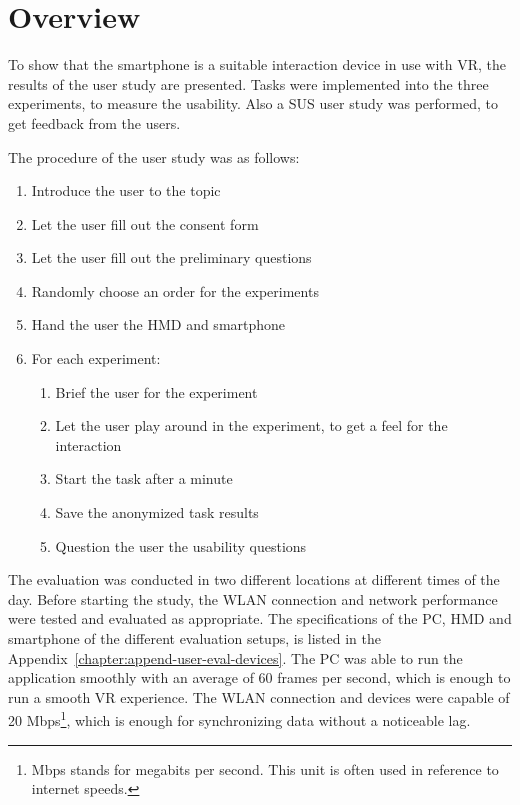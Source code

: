 \section{Overview}\label{section:evaluation-overview}

To show that the smartphone is a suitable interaction device in use with \ac{VR}, the results of the user study are presented. Tasks were implemented into the three experiments, to measure the usability. Also a \ac{SUS} user study was performed, to get feedback from the users.

The procedure of the user study was as follows:
\begin{enumerate}
  \item Introduce the user to the topic
  \item Let the user fill out the consent form
  \item Let the user fill out the preliminary questions
  \item Randomly choose an order for the experiments
  \item Hand the user the \ac{HMD} and smartphone
  \item For each experiment:
  \begin{enumerate}
  \item Brief the user for the experiment
  \item Let the user play around in the experiment, to get a feel for the interaction
  \item Start the task after a minute
  \item Save the anonymized task results
  \item Question the user the usability questions
  \end{enumerate}
\end{enumerate}

The evaluation was conducted in two different locations at different times of the day. Before starting the study, the \ac{WLAN} connection and network performance were tested and evaluated as appropriate. The specifications of the \ac{PC}, \ac{HMD} and smartphone of the different evaluation setups, is listed in the Appendix~\ref{chapter:append-user-eval-devices}. The \ac{PC} was able to run the application smoothly with an average of 60 frames per second, which is enough to run a smooth \ac{VR} experience. The \ac{WLAN} connection and devices were capable of 20 Mbps\footnote{Mbps stands for megabits per second. This unit is often used in reference to internet speeds.}, which is enough for synchronizing data without a noticeable lag.

